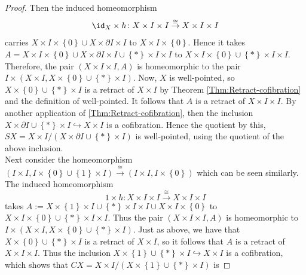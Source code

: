 \begin{proof}
    Then the induced homeomorphism
    \[
    \id_X \times h\colon X \times I \times I 
    \stackrel{\cong}{\to} X \times I \times I
    \] 
    carries 
    $X \times I \times \left\{ 0 \right\} \cup 
    X \times \partial I\times I$ to
    $X \times I \times \left\{ 0 \right\} $.
    Hence it takes
    $A = X \times I \times \left\{ 0 \right\} \cup 
    X \times \partial I \times I \cup 
    \left\{ * \right\} \times I \times I$ to
    $X \times I \times \left\{ 0 \right\} 
    \cup \left\{ * \right\} \times I \times I$. 
    Therefore, the pair
    $\left( X \times I \times I, A \right) $ is homeomorphic
    to the pair
    $I \times \left( X \times I, 
    X \times \left\{ 0 \right\} \cup 
\left\{ * \right\} \times I \right) $.
Now, $X$ is well-pointed, so
$X \times \left\{ 0 \right\} \cup 
\left\{ * \right\} \times I$ is a retract of
$X \times I$ by
Theorem \ref{Thm:Retract-cofibration} and the
definition of well-pointed.
It follows that
$A$ is a retract of
$X \times I \times I$.
By another application of
\ref{Thm:Retract-cofibration}, then
the inclusion
$X \times \partial I \cup \left\{ * \right\} \times I
\hookrightarrow X \times I$ is a cofibration. 
Hence the quotient by this,
$SX = X \times I / \left( X \times \partial I
\cup \left\{ * \right\} \times I \right) $ is well-pointed,
using the quotient of the above inclusion.\\
\linebreak
Next consider the homeomorphism
$\left( I \times I, I \times \left\{ 0 \right\} \cup 
\left\{ 1 \right\} \times I \right) 
\stackrel{\cong}{\to} \left( 
I \times I, I \times \left\{ 0 \right\} \right) $ which
can be seen similarly. The induced
homeomorphism
\[
1 \times h \colon X \times I \times I
\stackrel{\cong}{\to} X \times I \times I
\] 
takes
$A:= X \times \left\{ 1 \right\} \times I \cup 
\left\{ * \right\} \times I \times I
\cup X \times I \times \left\{ 0 \right\} $ to
$X \times I \times \left\{ 0 \right\} \cup 
\left\{ * \right\} \times I \times I$.
Thus the pair
$\left( X \times I \times I,
A\right) $ is homeomorphic to
 $I \times \left( X \times I,
 X \times \left\{ 0 \right\} \cup 
\left\{ * \right\} \times I\right) $.
Just as above, we have that
$X \times \left\{ 0 \right\} \cup 
\left\{ * \right\} \times I$ is a retract
of $X \times I$, so
it follows that
$A$ is a retract of $X \times I \times I$. Thus
the inclusion
$X \times \left\{ 1 \right\} \cup 
\left\{ * \right\} \times I \hookrightarrow
X \times I$ is a cofibration, which shows
that $CX = X \times I / \left( X \times \left\{ 1 \right\} 
\cup \left\{ * \right\} \times I\right) $ is

\end{proof}
